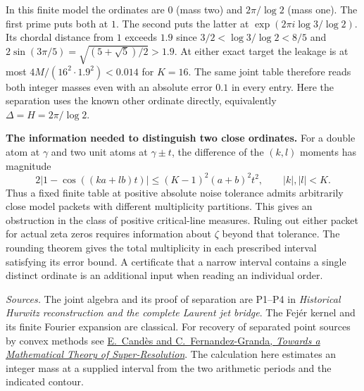 \documentclass[11pt,a4paper]{article}
\begin{document}
\begin{center}
\end{center}
In this finite model the ordinates are $0$ (mass two) and $2\pi/\log2$ (mass one). The first prime
puts both at $1$. The second puts the latter at $\exp(2\pi i\log3/\log2)$. Its chordal distance
from $1$ exceeds $1.9$ since $3/2<\log3/\log2<8/5$ and
$2\sin(3\pi/5)=\sqrt{(5+\sqrt5)/2}>1.9$. At either exact target the
leakage is at most $4M/(16^2\cdot1.9^2)<0.014$ for $K=16$. The same joint table therefore reads
both integer masses even with an absolute error $0.1$ in every entry. Here the separation
uses the known other ordinate directly, equivalently $\Delta=H=2\pi/\log2$.

\textbf{The information needed to distinguish two close ordinates.}
For a double atom at $\gamma$ and two unit atoms at $\gamma\pm t$, the difference of the $(k,l)$
moments has magnitude
\[
 2|1-\cos((ka+lb)t)|\le (K-1)^2(a+b)^2t^2,\qquad |k|,|l|<K.
\]
Thus a fixed finite table at positive absolute noise tolerance admits arbitrarily close model
packets with different multiplicity partitions. This gives an obstruction in the class of
positive critical-line measures. Ruling out either packet for actual zeta zeros requires
information about $\zeta$ beyond that tolerance. The rounding theorem gives the total multiplicity
in each prescribed interval satisfying its error bound. A certificate that a narrow interval
contains a single distinct ordinate is an additional input when reading an individual order.

\textit{Sources.} The joint algebra and its proof of separation are P1--P4 in
\emph{Historical Hurwitz reconstruction and the complete Laurent jet bridge}.
The Fejér kernel and its finite Fourier expansion are classical. For recovery of separated point
sources by convex methods see \href{https://arxiv.org/abs/1203.5871}{E.~Candès and C.~Fernandez-Granda,
\emph{Towards a Mathematical Theory of Super-Resolution}}. The calculation here estimates an
integer mass at a supplied interval from the two arithmetic periods and the indicated contour.
\end{document}
